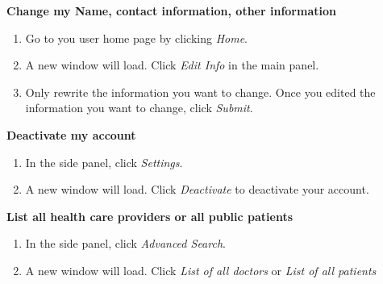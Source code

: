 \textbf{Change my Name, contact information, other information}
\begin{enumerate}
\item Go to you user home page by clicking \textit{Home}.
\item A new window will load. Click \textit{Edit Info} in the main panel.
\item Only rewrite the information you want to change. Once you edited the information you want to change, click \textit{Submit}.
\end{enumerate}
\textbf{Deactivate my account}
\begin{enumerate}
\item In the side panel, click \textit{Settings}.
\item A new window will load. Click \textit{Deactivate} to deactivate your account.
\end{enumerate}
\textbf{List all health care providers or all public patients}
\begin{enumerate}
\item In the side panel, click \textit{Advanced Search}.
\item A new window will load. Click \textit{List of all doctors} or \textit{List of all patients}
\end{enumerate}
